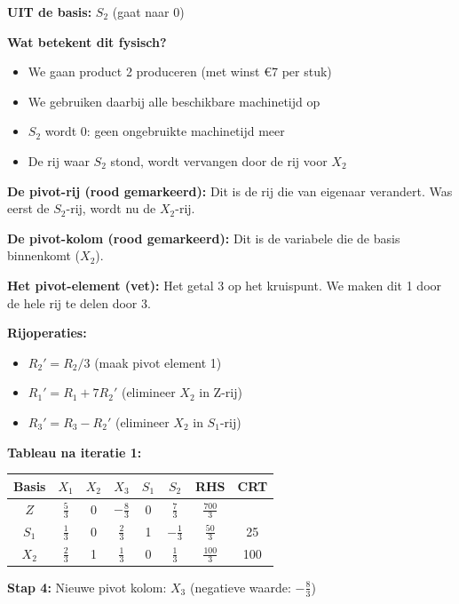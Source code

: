 \documentclass[a4paper,11pt]{article}
\begin{document}
\begin{oefenblok}[title=Productie Optimalisatie bij een Bedrijf]
\begin{warningbox}[title=Interpretatie van Pivot-operatie]
\textbf{UIT de basis:} $S_2$ (gaat naar 0)

\textbf{Wat betekent dit fysisch?}
\begin{itemize}
    \item We gaan product 2 produceren (met winst €7 per stuk)
    \item We gebruiken daarbij alle beschikbare machinetijd op
    \item $S_2$ wordt 0: geen ongebruikte machinetijd meer
    \item De rij waar $S_2$ stond, wordt vervangen door de rij voor $X_2$
\end{itemize}

\textbf{De pivot-rij (rood gemarkeerd):} Dit is de rij die van eigenaar verandert. Was eerst de $S_2$-rij, wordt nu de $X_2$-rij.

\textbf{De pivot-kolom (rood gemarkeerd):} Dit is de variabele die de basis binnenkomt ($X_2$).

\textbf{Het pivot-element (vet):} Het getal 3 op het kruispunt. We maken dit 1 door de hele rij te delen door 3.
\end{warningbox}

\textbf{Rijoperaties:}
\begin{itemize}
    \item $R_2' = R_2 / 3$ (maak pivot element 1)
    \item $R_1' = R_1 + 7R_2'$ (elimineer $X_2$ in Z-rij)
    \item $R_3' = R_3 - R_2'$ (elimineer $X_2$ in $S_1$-rij)
\end{itemize}

\textbf{Tableau na iteratie 1:}

\begin{center}
\begin{tabular}{c|ccccc|c|c}
\hline
Basis & $X_1$ & $X_2$ & $X_3$ & $S_1$ & $S_2$ & RHS & CRT \\
\hline
$Z$ & $\frac{5}{3}$ & 0 & $-\frac{8}{3}$ & 0 & $\frac{7}{3}$ & $\frac{700}{3}$ & \\
$S_1$ & $\frac{1}{3}$ & 0 & $\frac{2}{3}$ & 1 & $-\frac{1}{3}$ & $\frac{50}{3}$ & 25 \\
$X_2$ & $\frac{2}{3}$ & 1 & $\frac{1}{3}$ & 0 & $\frac{1}{3}$ & $\frac{100}{3}$ & 100 \\
\hline
\end{tabular}
\end{center}

\textbf{Stap 4:} Nieuwe pivot kolom: $X_3$ (negatieve waarde: $-\frac{8}{3}$)


\end{oefenblok}
\end{document}
